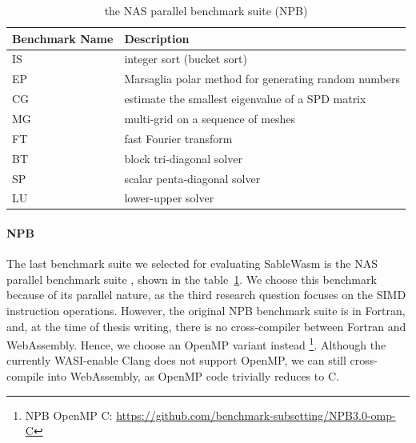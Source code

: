 \begin{table}
    \centering
    \begin{tabular}{|l|l|}
        \hline
        \textbf{Benchmark Name} & \textbf{Description}                                 \\ \hline
        IS                      & integer sort (bucket sort)                           \\ \hline
        EP                      & Marsaglia polar method for generating random numbers \\ \hline
        CG                      & estimate the smallest eigenvalue of a SPD matrix     \\ \hline
        MG                      & multi-grid on a sequence of meshes                   \\ \hline
        FT                      & fast Fourier transform                               \\ \hline
        BT                      & block tri-diagonal solver                            \\ \hline
        SP                      & scalar penta-diagonal solver                         \\ \hline
        LU                      & lower-upper solver                                   \\ \hline
    \end{tabular}
    \caption{the NAS parallel benchmark suite (NPB)}
    \label{tbl:npb}
\end{table}

\paragraph{NPB}
The last benchmark suite we selected for evaluating SableWasm is the NAS parallel benchmark suite \cite{npb}, shown in the table~\ref{tbl:npb}. We choose this benchmark because of its parallel nature, as the third research question focuses on the SIMD instruction operations. However, the original NPB benchmark suite is in Fortran, and, at the time of thesis writing, there is no cross-compiler between Fortran and WebAssembly. Hence, we choose an OpenMP variant instead \footnote{NPB OpenMP C: \url{https://github.com/benchmark-subsetting/NPB3.0-omp-C}}. Although the currently WASI-enable Clang does not support OpenMP, we can still cross-compile into WebAssembly, as OpenMP code trivially reduces to C.

